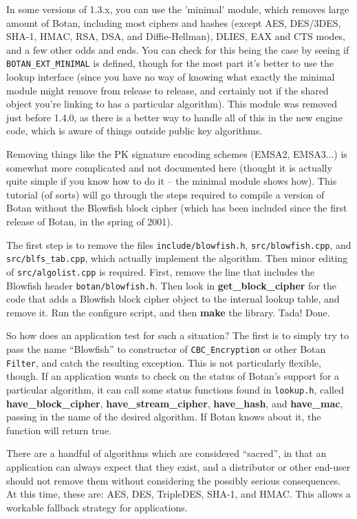 \documentclass{article}
\newcommand{\filename}[1]{\texttt{#1}}
\newcommand{\macro}[1]{\texttt{#1}}
\newcommand{\function}[1]{\textbf{#1}}
\newcommand{\type}[1]{\texttt{#1}}
\begin{document}
In some versions of 1.3.x, you can use the 'minimal' module, which removes
large amount of Botan, including most ciphers and hashes (except AES, DES/3DES,
SHA-1, HMAC, RSA, DSA, and Diffie-Hellman), DLIES, EAX and CTS modes, and a few
other odds and ends. You can check for this being the case by seeing if
\macro{BOTAN\_EXT\_MINIMAL} is defined, though for the most part it's better to
use the lookup interface (since you have no way of knowing what exactly the
minimal module might remove from release to release, and certainly not if the
shared object you're linking to has a particular algorithm). This module was
removed just before 1.4.0, as there is a better way to handle all of this in
the new engine code, which is aware of things outside public key algorithms.

Removing things like the PK signature encoding schemes (EMSA2, EMSA3...) is
somewhat more complicated and not documented here (thought it is actually quite
simple if you know how to do it -- the minimal module shows how). This tutorial
(of sorts) will go through the steps required to compile a version of Botan
without the Blowfish block cipher (which has been included since the first
release of Botan, in the spring of 2001).

The first step is to remove the files \filename{include/blowfish.h},
\filename{src/blowfish.cpp}, and \filename{src/blfs\_tab.cpp}, which actually
implement the algorithm. Then minor editing of \filename{src/algolist.cpp} is
required. First, remove the line that includes the Blowfish header
\filename{botan/blowfish.h}. Then look in \function{get\_block\_cipher} for the
code that adds a Blowfish block cipher object to the internal lookup table, and
remove it. Run the configure script, and then \textbf{make} the library. Tada!
Done.

So how does an application test for such a situation? The first is to simply
try to pass the name ``Blowfish'' to constructor of \type{CBC\_Encryption} or
other Botan \type{Filter}, and catch the resulting exception. This is not
particularly flexible, though. If an application wants to check on the status
of Botan's support for a particular algorithm, it can call some status
functions found in \filename{lookup.h}, called \function{have\_block\_cipher},
\function{have\_stream\_cipher}, \function{have\_hash}, and
\function{have\_mac}, passing in the name of the desired algorithm. If Botan
knows about it, the function will return true.

There are a handful of algorithms which are considered ``sacred'', in that an
application can always expect that they exist, and a distributor or other
end-user should not remove them without considering the possibly serious
consequences. At this time, these are: AES, DES, TripleDES, SHA-1, and HMAC.
This allows a workable fallback strategy for applications.
\end{document}
